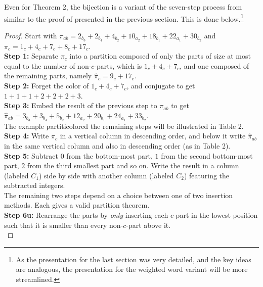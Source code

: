 \documentclass[12pt,a4paper]{amsart}
\theoremstyle{definition}
\theoremstyle{notation}
\theoremstyle{corollary}
\begin{document}
Even for Theorem 2, the bijection is a variant of the seven-step process from \cite{KAGEABG95} similar to the proof of \cite[Thm.~C5]{YAKA25} presented in the previous section. This is done below.\footnote{As the presentation for the last section was very detailed, and the key ideas are analogous, the presentation for the weighted word variant will be more streamlined.}\\

\begin{proof}
    

Start with $\pi_{ab}=2_{b_3}+2_{b_4}+4_{b_2}+10_{a_2}+18_{b_1}+22_{a_1}+30_{b_2}$ and $\pi_c=1_c+4_c+7_c+8_c+17_c$.\\

\textbf{Step 1:} Separate $\pi_c$ into a partition composed of only the parts of size at most equal to the number of non-$c$-parts, which is $1_c+4_c+7_c$, and one composed of the remaining parts, namely $\hat{\pi}_c=9_c+17_c$.\\

\textbf{Step 2:} Forget the color of $1_c+4_c+7_c$, and conjugate to get $1+1+1+2+2+2+3$.\\

\textbf{Step 3:} Embed the result of the previous step to $\pi_{ab}$ to get $\hat{\pi}_{ab}=3_{b_3}+3_{b_4}+5_{b_2}+12_{a_2}+20_{b_1}+24_{a_1}+33_{b_2}$.\\

The example partiticolored the remaining steps will be illustrated in Table 2.\\ 

\textbf{Step 4:}
Write $\hat{\pi}_{c}$ in a vertical column in descending order, and below it write $\hat{\pi}_{ab}$ in the same vertical column and also in descending order (as in  Table 2).\\

\textbf{Step 5:}
Subtract $0$ from the bottom-most part, $1$ from the second bottom-most part, $2$ from the third smallest part and so on. Write the result in a column (labeled $C_1$) side by side with another column (labeled $C_2$) featuring the subtracted integers.\\

The remaining two steps depend on a choice between one of two insertion methods. Each gives a valid partition theorem.\\

\textbf{Step 6u:}
Rearrange the parts by \textit{only} inserting each $c$-part in the lowest position such that it is smaller than every non-$c$-part above it.\\



\end{proof}
\end{document}

